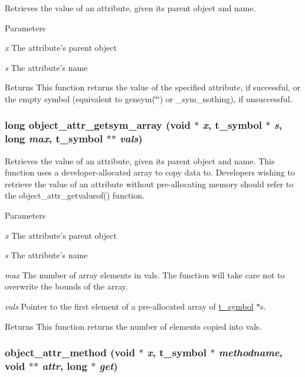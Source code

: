 Retrieves the value of an attribute, given its parent object and name. 
\begin{DoxyParams}{Parameters}
\item[{\em x}]The attribute's parent object \item[{\em s}]The attribute's name\end{DoxyParams}
\begin{DoxyReturn}{Returns}
This function returns the value of the specified attribute, if successful, or the empty symbol (equivalent to {\ttfamily gensym(\char`\"{}\char`\"{})} or {\ttfamily \_\-sym\_\-nothing}), if unsuccessful. 
\end{DoxyReturn}
\hypertarget{group__attr_ga916469e459d397adee123bb36de99c2c}{
\subsubsection[{object\_\-attr\_\-getsym\_\-array}]{\setlength{\rightskip}{0pt plus 5cm}long object\_\-attr\_\-getsym\_\-array (void $\ast$ {\em x}, \/  {\bf t\_\-symbol} $\ast$ {\em s}, \/  long {\em max}, \/  {\bf t\_\-symbol} $\ast$$\ast$ {\em vals})}}
\label{group__attr_ga916469e459d397adee123bb36de99c2c}


Retrieves the value of an attribute, given its parent object and name. This function uses a developer-\/allocated array to copy data to. Developers wishing to retrieve the value of an attribute without pre-\/allocating memory should refer to the object\_\-attr\_\-getvalueof() function.


\begin{DoxyParams}{Parameters}
\item[{\em x}]The attribute's parent object \item[{\em s}]The attribute's name \item[{\em max}]The number of array elements in {\ttfamily vals}. The function will take care not to overwrite the bounds of the array. \item[{\em vals}]Pointer to the first element of a pre-\/allocated array of \hyperlink{structt__symbol}{t\_\-symbol} $\ast$s.\end{DoxyParams}
\begin{DoxyReturn}{Returns}
This function returns the number of elements copied into {\ttfamily vals}. 
\end{DoxyReturn}
\hypertarget{group__attr_ga6f3c64b07f0bef74e968f41925d2a595}{
\subsubsection[{object\_\-attr\_\-method}]{ object\_\-attr\_\-method (void $\ast$ {\em x}, \/  {\bf t\_\-symbol} $\ast$ {\em methodname}, \/  void $\ast$$\ast$ {\em attr}, \/  long $\ast$ {\em get})}}
\label{group__attr_ga6f3c64b07f0bef74e968f41925d2a595}


